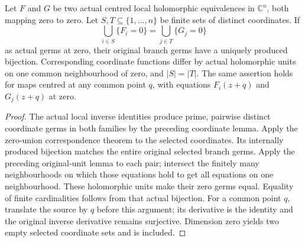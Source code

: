 \begin{theorem}
\label{hir:actual-normal-crossing-chart-branch-correspondence}
\leanok
Let $F$ and $G$ be two actual centred local holomorphic equivalences in
$\mathbb C^n$, both mapping zero to zero. Let $S,T\subseteq\{1,\ldots,n\}$
be finite sets of distinct coordinates. If
\[
 \bigcup_{i\in S}\{F_i=0\}=\bigcup_{j\in T}\{G_j=0\}
\]
as actual germs at zero, their original branch germs have a uniquely
produced bijection. Corresponding coordinate functions differ by actual
holomorphic units on one common neighbourhood of zero, and $|S|=|T|$.
The same assertion holds for maps centred at any common point $q$, with
equations $F_i(z+q)$ and $G_j(z+q)$ at zero.
\end{theorem}
\begin{proof}
The actual local inverse identities produce prime, pairwise distinct
coordinate germs in both families by the preceding coordinate lemma.
Apply the zero-union correspondence theorem to the selected coordinates.
Its internally produced bijection matches the entire original selected
branch germs. Apply the preceding original-unit lemma to each pair;
intersect the finitely many neighbourhoods on which those equations
hold to get all equations on one neighbourhood. These holomorphic units
make their zero germs equal.
Equality of finite cardinalities follows from that actual bijection.
For a common point $q$, translate the source by $q$ before this argument;
its derivative is the identity and the original inverse derivative
remains surjective. Dimension zero yields two empty selected coordinate
sets and is included.
\end{proof}

